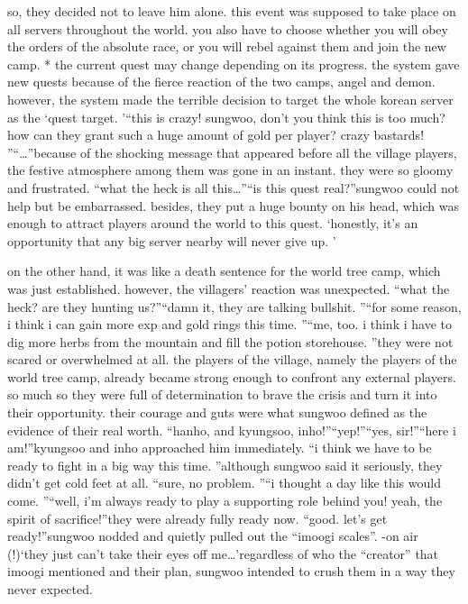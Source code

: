  so, they decided not to leave him alone.
 this event was supposed to take place on all servers throughout the world.
 you also have to choose whether you will obey the orders of the absolute race, or you will rebel against them and join the new camp.
* the current quest may change depending on its progress.
the system gave new quests because of the fierce reaction of the two camps, angel and demon.
 however, the system made the terrible decision to target the whole korean server as the ‘quest target.
’“this is crazy! sungwoo, don’t you think this is too much? how can they grant such a huge amount of gold per player? crazy bastards! ”“…”because of the shocking message that appeared before all the village players, the festive atmosphere among them was gone in an instant.
 they were so gloomy and frustrated.
“what the heck is all this…”“is this quest real?”sungwoo could not help but be embarrassed.
 besides, they put a huge bounty on his head, which was enough to attract players around the world to this quest.
‘honestly, it’s an opportunity that any big server nearby will never give up.
’

on the other hand, it was like a death sentence for the world tree camp, which was just established.
however, the villagers’ reaction was unexpected.
“what the heck? are they hunting us?”“damn it, they are talking bullshit.
”“for some reason, i think i can gain more exp and gold rings this time.
”“me, too.
 i think i have to dig more herbs from the mountain and fill the potion storehouse.
”they were not scared or overwhelmed at all.
 the players of the village, namely the players of the world tree camp, already became strong enough to confront any external players.
so much so they were full of determination to brave the crisis and turn it into their opportunity.
 their courage and guts were what sungwoo defined as the evidence of their real worth.
“hanho, and kyungsoo, inho!”“yep!”“yes, sir!”“here i am!”kyungsoo and inho approached him immediately.
“i think we have to be ready to fight in a big way this time.
”although sungwoo said it seriously, they didn’t get cold feet at all.
“sure, no problem.
”“i thought a day like this would come.
”“well, i’m always ready to play a supporting role behind you! yeah, the spirit of sacrifice!”they were already fully ready now.
“good.
 let’s get ready!”sungwoo nodded and quietly pulled out the “imoogi scales”.
-on air (!)‘they just can’t take their eyes off me…’regardless of who the “creator” that imoogi mentioned and their plan, sungwoo intended to crush them in a way they never expected.


 
